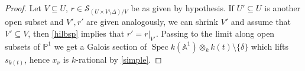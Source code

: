 \documentclass[11pt]{amsart}
\theoremstyle{plain}
\theoremstyle{definition}
\newcommand{\on}{\operatorname}
\newcommand{\1}{\mathbb{1}}
\newcommand{\A}{\mathbb{A}}
\newcommand{\mc}{\mathcal}
\newcommand{\s}{\subseteq}
\newcommand{\spec}{\on{Spec}}
\renewcommand{\P}{\mathbb{P}}
\begin{document}
\begin{TC}
\begin{proof}
		Let $V\s U$, $r\in\mc{S}_{(U\times V\setminus\Delta)/V}$ be as given by hypothesis. If $U'\s U$ is another open subset and $V',r'$ are given analogously, we can shrink $V'$ and assume that $V'\s V$, then \autoref{hilbsp} implies that $r'=r|_{V'}$. Passing to the limit along open subsets of $\P^{1}$ we get a Galois section of $\spec k(\A^{1})\otimes_{k}k(t)\setminus\{\delta\}$ which lifts $s_{k(t)}$, hence $x_{\nu}$ is $k$-rational by \autoref{simple}.	
	\end{proof}
\end{TC}






	
\end{document}
